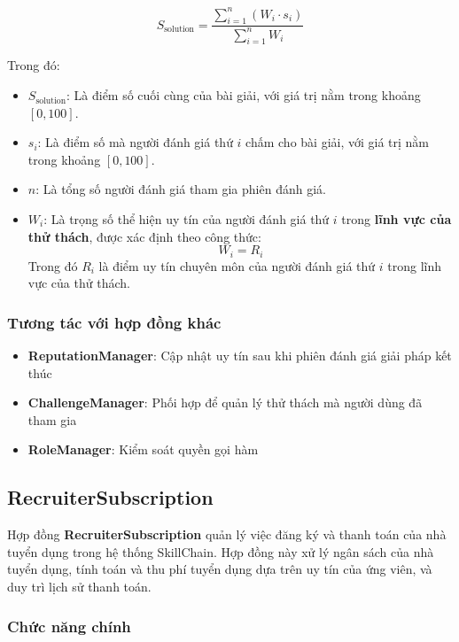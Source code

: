 \[
S_{\text{solution}}= \frac{\displaystyle\sum_{i=1}^{n} (W_{i} \cdot s_{i})}{\displaystyle\sum_{i=1}^{n} W_{i}}
\]

Trong đó:

\begin{itemize}
  \item $S_{\text{solution}}$: Là điểm số cuối cùng của bài giải, với giá trị nằm trong khoảng $[0, 100]$.
  \item $s_{i}$: Là điểm số mà người đánh giá thứ $i$ chấm cho bài giải, với giá trị nằm trong khoảng $[0, 100]$.
  \item $n$: Là tổng số người đánh giá tham gia phiên đánh giá.
  \item $W_{i}$: Là trọng số thể hiện uy tín của người đánh giá thứ $i$ trong \textbf{lĩnh vực của thử thách}, được xác định theo công thức:
  \[
  W_{i} = R_{i}
  \]
  Trong đó $R_{i}$ là điểm uy tín chuyên môn của người đánh giá thứ $i$ trong lĩnh vực của thử thách.
\end{itemize}



\subsubsection{Tương tác với hợp đồng khác}

\begin{itemize}
  \item \textbf{ReputationManager}: Cập nhật uy tín sau khi phiên đánh giá giải pháp kết thúc
  \item \textbf{ChallengeManager}: Phối hợp để quản lý thử thách mà người dùng đã tham gia
  \item \textbf{RoleManager}: Kiểm soát quyền gọi hàm
\end{itemize}

\subsection{RecruiterSubscription}

Hợp đồng \textbf{RecruiterSubscription} quản lý việc đăng ký và thanh toán của nhà tuyển dụng trong hệ thống SkillChain.
Hợp đồng này xử lý ngân sách của nhà tuyển dụng, tính toán và thu phí tuyển dụng dựa trên uy tín của ứng viên, và duy trì lịch sử thanh toán.

\subsubsection{Chức năng chính}

